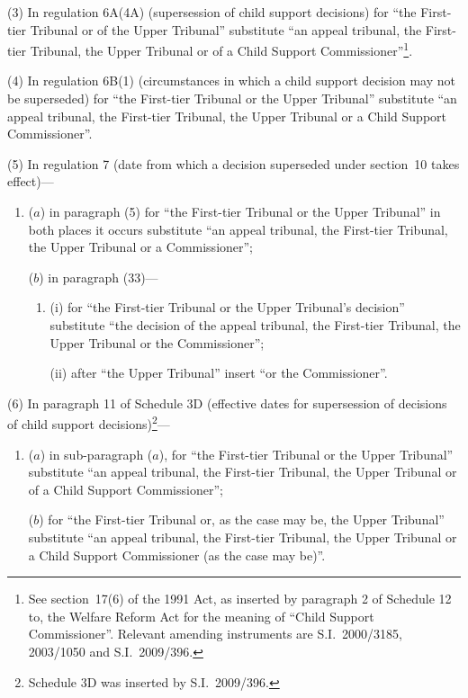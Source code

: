 \documentclass[12pt,a4paper]{article}
\begin{document}
(3) In regulation 6A(4A) (supersession of child support decisions) for “the First-tier Tribunal or of the Upper Tribunal” substitute “an appeal tribunal, the First-tier Tribunal, the Upper Tribunal or of a Child Support Commissioner”\footnote{See section~17(6) of the 1991 Act, as inserted by paragraph 2 of Schedule 12 to, the Welfare Reform Act for the meaning of “Child Support Commissioner”. Relevant amending instruments are S.I.~2000/3185, 2003/1050 and S.I.~2009/396.}.

(4) In regulation 6B(1) (circumstances in which a child support decision may not be superseded) for “the First-tier Tribunal or the Upper Tribunal” substitute “an appeal tribunal, the First-tier Tribunal, the Upper Tribunal or a Child Support Commissioner”.

(5) In regulation 7 (date from which a decision superseded under section~10 takes effect)—
\begin{enumerate}\item[]
($a$) in paragraph (5) for “the First-tier Tribunal or the Upper Tribunal” in both places it occurs substitute “an appeal tribunal, the First-tier Tribunal, the Upper Tribunal or a Commissioner”;

($b$) in paragraph (33)—
\begin{enumerate}\item[]
(i) for “the First-tier Tribunal or the Upper Tribunal’s decision” substitute “the decision of the appeal tribunal, the First-tier Tribunal, the Upper Tribunal or the Commissioner”;

(ii) after “the Upper Tribunal” insert ``or the Commissioner”.
\end{enumerate}
\end{enumerate}

(6) In paragraph 11 of Schedule 3D (effective dates for supersession of decisions of child support decisions)\footnote{Schedule 3D was inserted by S.I.~2009/396.}—
\begin{enumerate}\item[]
($a$) in sub-paragraph ($a$), for “the First-tier Tribunal or the Upper Tribunal” substitute “an appeal tribunal, the First-tier Tribunal, the Upper Tribunal or of a Child Support Commissioner”;

($b$) for “the First-tier Tribunal or, as the case may be, the Upper Tribunal” substitute “an appeal tribunal, the First-tier Tribunal, the Upper Tribunal or a Child Support Commissioner (as the case may be)”.
\end{enumerate}
\end{document}
